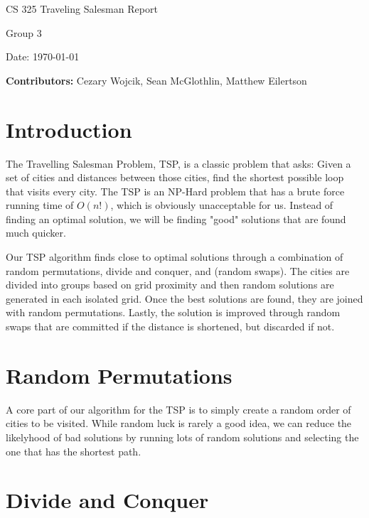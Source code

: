 \documentclass[12pt,letterpaper]{article}
\begin{document}
\begin{titlepage}
    \vspace*{4cm}
    {\huge \center
        CS 325 Traveling Salesman Report\\[1cm]
    }
    \center
    {\large
        Group 3

        Date: \today

    \textbf{Contributors:}
    Cezary Wojcik,
    Sean McGlothlin,
    Matthew Eilertson
    }

\end{titlepage}

\section*{Introduction}

The Travelling Salesman Problem, TSP, is a classic problem that asks: Given a set of cities and distances between those cities, find the shortest possible loop that visits every city. The TSP is an NP-Hard problem that has a brute force running time of $O(n!)$, which is obviously unacceptable for us. Instead of finding an optimal solution, we will be finding "good" solutions that are found much quicker.

Our TSP algorithm finds close to optimal solutions through a combination of random permutations, divide and conquer, and (random swaps). The cities are divided into groups based on grid proximity and then random solutions are generated in each isolated grid. Once the best solutions are found, they are joined with random permutations. Lastly, the solution is improved through random swaps that are committed if the distance is shortened, but discarded if not.



\section*{Random Permutations}

A core part of our algorithm for the TSP is to simply create a random order of cities to be visited. While random luck is rarely a good idea, we can reduce the likelyhood of bad solutions by running lots of random solutions and selecting the one that has the shortest path. 


\section*{Divide and Conquer}
\end{document}
